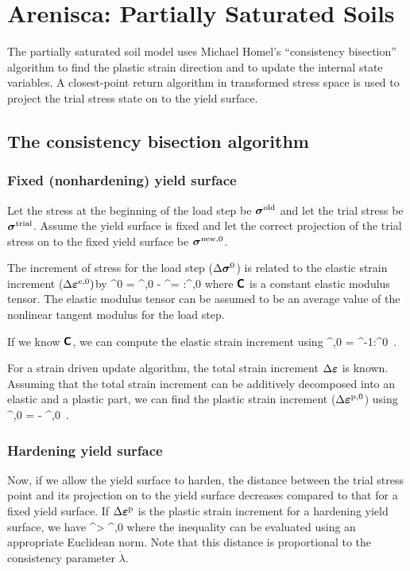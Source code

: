 \chapter{Arenisca: Partially Saturated Soils}

The partially saturated soil model uses Michael Homel's ``consistency bisection'' algorithm 
to find the plastic strain direction and to update the internal state variables.  A closest-point
return algorithm in transformed stress space is used to project the trial stress state on to the
yield surface.

\section{The consistency bisection algorithm}
\subsection{Fixed (nonhardening) yield surface}
Let the stress at the beginning of the load step be $\boldsymbol{\sigma}^{\text{old}}$ and let the trial stress be 
$\boldsymbol{\sigma}^{\text{trial}}$.  Assume the yield surface is fixed and let the correct projection of the trial 
stress on to the fixed yield surface be $\boldsymbol{\sigma}^{\text{new}, 0}$.

The increment of stress for the load step ($\Delta\boldsymbol{\sigma}^0$) is related to the 
elastic strain increment ($\Delta\boldsymbol{\varepsilon}^{\text{e},0}) $by
\Beq
  \Delta\Bsig^0 = \Bsig^{\Tnew,0} - \Bsig^\Told = \SfC:\Delta\Bveps^{\Te,0}
\Eeq
where $\boldsymbol{\mathsf{C}}$ is a constant elastic modulus tensor.  The elastic modulus tensor can be assumed
to be an average value of the nonlinear tangent modulus for the load step.

If we know $\boldsymbol{\mathsf{C}}$, we can compute the elastic strain increment using
\Beq
  \Delta\Bveps^{\Te,0} = \SfC^{-1}:\Delta\Bsig^0 \,.
\Eeq

For a strain driven update algorithm, the total strain increment $\Delta\boldsymbol{\varepsilon}$ is known.
Assuming that the total strain increment can be additively decomposed into an elastic and a 
plastic part, we can find the plastic strain increment ($\Delta\boldsymbol{\varepsilon}^{\text{p},0}$) using
\Beq
  \Delta\Bveps^{\Tp,0} = \Delta\Bveps - \Delta\Bveps^{\Te,0} \,.
\Eeq

\subsection{Hardening yield surface}
Now, if we allow the yield surface to harden, the distance between the trial stress point and its 
projection on to the yield surface decreases compared to that for a fixed yield surface.  If
$\Delta\boldsymbol{\varepsilon}^{\text{p}}$ is the plastic strain increment for a hardening yield surface, we have
\Beq
  \Delta\Bveps^\Tp > \Delta\Bveps^{\Tp,0}   
\Eeq
where the inequality can be evaluated using an appropriate Euclidean norm.
Note that this distance is proportional to the consistency parameter $\dot{\lambda}$.

